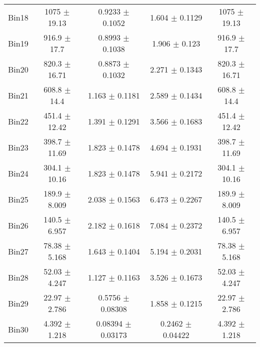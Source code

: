 \begin{tabular}{@{\extracolsep{4pt}}lcccc@{}}
     Bin18 & 1075 $\pm$ 19.13 & 0.9233 $\pm$ 0.1052 & 1.604 $\pm$ 0.1129 & 1075 $\pm$ 19.13 \\ 
     Bin19 & 916.9 $\pm$ 17.7 & 0.8993 $\pm$ 0.1038 & 1.906 $\pm$ 0.123 & 916.9 $\pm$ 17.7 \\ 
     Bin20 & 820.3 $\pm$ 16.71 & 0.8873 $\pm$ 0.1032 & 2.271 $\pm$ 0.1343 & 820.3 $\pm$ 16.71 \\ 
     Bin21 & 608.8 $\pm$ 14.4 & 1.163 $\pm$ 0.1181 & 2.589 $\pm$ 0.1434 & 608.8 $\pm$ 14.4 \\ 
     Bin22 & 451.4 $\pm$ 12.42 & 1.391 $\pm$ 0.1291 & 3.566 $\pm$ 0.1683 & 451.4 $\pm$ 12.42 \\ 
     Bin23 & 398.7 $\pm$ 11.69 & 1.823 $\pm$ 0.1478 & 4.694 $\pm$ 0.1931 & 398.7 $\pm$ 11.69 \\ 
     Bin24 & 304.1 $\pm$ 10.16 & 1.823 $\pm$ 0.1478 & 5.941 $\pm$ 0.2172 & 304.1 $\pm$ 10.16 \\ 
     Bin25 & 189.9 $\pm$ 8.009 & 2.038 $\pm$ 0.1563 & 6.473 $\pm$ 0.2267 & 189.9 $\pm$ 8.009 \\ 
     Bin26 & 140.5 $\pm$ 6.957 & 2.182 $\pm$ 0.1618 & 7.084 $\pm$ 0.2372 & 140.5 $\pm$ 6.957 \\ 
     Bin27 & 78.38 $\pm$ 5.168 & 1.643 $\pm$ 0.1404 & 5.194 $\pm$ 0.2031 & 78.38 $\pm$ 5.168 \\ 
     Bin28 & 52.03 $\pm$ 4.247 & 1.127 $\pm$ 0.1163 & 3.526 $\pm$ 0.1673 & 52.03 $\pm$ 4.247 \\ 
     Bin29 & 22.97 $\pm$ 2.786 & 0.5756 $\pm$ 0.08308 & 1.858 $\pm$ 0.1215 & 22.97 $\pm$ 2.786 \\ 
     Bin30 & 4.392 $\pm$ 1.218 & 0.08394 $\pm$ 0.03173 & 0.2462 $\pm$ 0.04422 & 4.392 $\pm$ 1.218 \\ 
\hline\hline
  \end{tabular}
